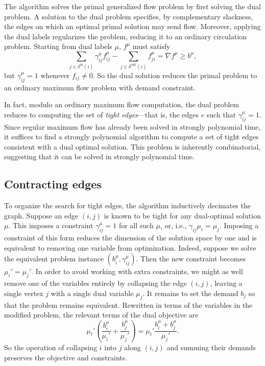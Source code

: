 \documentclass[12pt]{article}
\theoremstyle{definition}
\newcommand{\fu}{f^{\mu}}
\newcommand{\biu}{b_{i}^{\mu}}
\newcommand{\gij}{\gamma_{ij}}
\newcommand{\gie}{\gij^{\mu}}
\newcommand{\giij}{\gamma_{ij}^{\mu}}
\newcommand{\din}{\delta^{\text{in}}}
\newcommand{\dout}{\delta^{\text{out}}}
\begin{document}
	The algorithm solves the primal generalized flow problem by first solving the dual problem.
    A solution to the dual problem specifies, by complementary slackness, the edges on which an optimal
    primal solution may send flow. Moreover, applying the dual labels regularizes the problem, reducing
    it to an ordinary circulation problem. Starting from dual labels $\mu$, $f^{\mu}$ must satisfy
    \[ \sum_{j \in \din(i)} \giij \fu_{ij} - \sum_{j \in \dout(i)} \fu_{ji}
     = \nabla f^{\mu} \geq b^{\mu}, \]
    but $\giij = 1$ whenever $f_{ij} \neq 0$. So the dual solution reduces the primal problem
    to an ordinary maximum flow problem with demand constraint.
    
    In fact, modulo an ordinary maximum flow computation, the dual problem reduces to computing
    the set of \emph{tight edges}---that is, the edges $e$ such that $\gie = 1$. Since regular maximum
    flow has already been solved in strongly polynomial time, it suffices to find a strongly polynomial
    algorithm to compute a set of tight edges consistent with a dual optimal solution. This problem
    is inherently combinatorial, suggesting that it can be solved in strongly polynomial time.
    
    \subsection{Contracting edges}
    To organize the search for tight edges, the algorithm inductively decimates the graph.
    Suppose an edge $(i, j)$ is known to be tight for any dual-optimal solution $\mu$. This
    imposes a constraint $\giij = 1$ for all such $\mu$, or, i.e., $\gij \mu_i = \mu_j$.
    Imposing a constraint of this form reduces the dimension of the solution
    space by one and is equivalent to removing one variable from optimization. Indeed,
    suppose we solve the equivalent problem instance $(\biu, \giij)$. Then the new constraint
    becomes $\mu_i' = \mu_j'$. In order to avoid working with extra constraints, we might
    as well remove one of the variables entirely by collapsing the edge $(i, j)$, leaving a single
    vertex $j$ with a single dual variable $\mu_j$. It remains to set the demand $b_j$ so
    that the problem remains equivalent. Rewritten in terms of the variables in
    the modified problem, the relevant terms of the dual objective are
    \[ \mu_t' \left(\frac{b_i^\mu}{\mu_i'} + \frac{b_j^\mu}{\mu_j'}\right)
     = \mu_t' \frac{b_i^\mu + b_j^\mu}{\mu_j'}. \]
	So the operation of collapsing $i$ into $j$ along $(i, j)$ and summing their demands
	preserves the objective and constraints.
	
\end{document}
